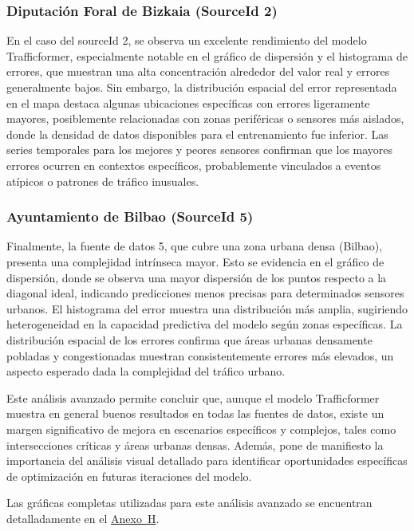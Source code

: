 \subsubsection*{Diputación Foral de Bizkaia (SourceId 2)}
En el caso del sourceId 2, se observa un excelente rendimiento del modelo Trafficformer, especialmente notable en el gráfico de dispersión y el histograma de errores, que muestran una alta concentración alrededor del valor real y errores generalmente bajos. Sin embargo, la distribución espacial del error representada en el mapa destaca algunas ubicaciones específicas con errores ligeramente mayores, posiblemente relacionadas con zonas periféricas o sensores más aislados, donde la densidad de datos disponibles para el entrenamiento fue inferior. Las series temporales para los mejores y peores sensores confirman que los mayores errores ocurren en contextos específicos, probablemente vinculados a eventos atípicos o patrones de tráfico inusuales.

\subsubsection*{Ayuntamiento de Bilbao (SourceId 5)}
Finalmente, la fuente de datos 5, que cubre una zona urbana densa (Bilbao), presenta una complejidad intrínseca mayor. Esto se evidencia en el gráfico de dispersión, donde se observa una mayor dispersión de los puntos respecto a la diagonal ideal, indicando predicciones menos precisas para determinados sensores urbanos. El histograma del error muestra una distribución más amplia, sugiriendo heterogeneidad en la capacidad predictiva del modelo según zonas específicas. La distribución espacial de los errores confirma que áreas urbanas densamente pobladas y congestionadas muestran consistentemente errores más elevados, un aspecto esperado dada la complejidad del tráfico urbano.

Este análisis avanzado permite concluir que, aunque el modelo Trafficformer muestra en general buenos resultados en todas las fuentes de datos, existe un margen significativo de mejora en escenarios específicos y complejos, tales como intersecciones críticas y áreas urbanas densas. Además, pone de manifiesto la importancia del análisis visual detallado para identificar oportunidades específicas de optimización en futuras iteraciones del modelo.

Las gráficas completas utilizadas para este análisis avanzado se encuentran detalladamente en el \hyperref[anexo:analisis_avanzado]{Anexo~H}.